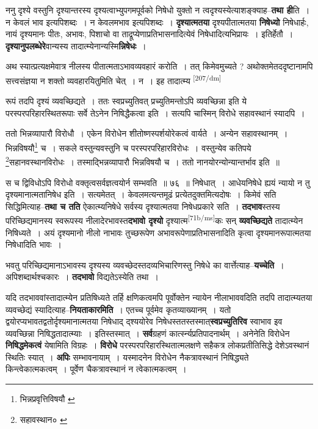 \documentclass[article,12pt,a4paper]{memoir}
\begin{document}
	  \pstart ननु दृश्ये वस्तुनि दृश्यान्तरस्य दृश्यत्वाभ्युपगमपूर्वको निषेधो युक्तो न त्वदृश्यस्येत्याशङ्क्याह--\textbf{तथा ही}ति । न केवलं भाव इत्यपिशब्दः । न केवलमभाव इत्यपिशब्दः । \textbf{दृश्यात्मतया} दृश्यपीतात्मतया \textbf{निषेध्यो} निषेधार्हः, नायं दृश्यमानः पीतः, अभावः, पिशाचो वा ताद्रूप्येणाप्रतिभासनादित्येवं निषेधादित्यभिप्रायः । इतिर्हेतौ । \textbf{दृश्यानुपलब्धेरे}वान्यस्य तादात्म्येनान्यस्मि\textbf{न्निषेधः} ।
	\pend
      

	  \pstart अथ स्यात्प्रत्यक्षमेवात्र नीलस्य पीतात्मताऽभावव्यवहारं करोति । तत् किमेवमुच्यते ? अथोक्तमेतददृष्टानामपि सत्त्वसंज्ञया न शक्तो व्यवहारयितुमिति चेत् । न । इह तादात्म्य \leavevmode\textsuperscript{\rmlatinfont\tiny [207/dm]} 
	  
	रूपं तदपि दृश्यं व्यवच्छिद्यते । ततः स्वप्रच्युतिवत् प्रच्युतिमन्तोऽपि व्यवच्छिन्ना इति ये परस्परपरिहारस्थितरूपाः सर्वे तेऽनेन निषिद्धैकत्वा इति । सत्यपि चास्मिन् विरोधे सहावस्थानं स्यादपि । 
	  
	ततो भिन्नव्यापारौ विरोधौ । एकेन विरोधेन शीतोष्णस्पर्शयोरेकत्वं वार्यते । अन्येन सहावस्थानम् । भिन्नविषयौ\footnote{भिन्नप्रवृत्तिविषयौ \cite{dp-msA} \cite{dp-edP} \cite{dp-edH} \cite{dp-edN}} च । सकले वस्तुन्यवस्तुनि च परस्परपरिहारविरोधः । वस्तुन्येव कतिपये \footnote{सहावस्थान० \cite{dp-msB} \cite{dp-msC}}सहानवस्थानविरोधः । तस्माद्भिन्नव्यापारौ भिन्नविषयौ च । ततो नानयोरन्योन्यान्तर्भाव इति ॥ 
	  
	स च द्विविधोऽपि विरोधो वक्तृत्वसर्वज्ञत्वयोर्न सम्भवति ॥ ७६ ॥ निषेधात् । आधेयनिषेधे ह्ययं न्यायो न तु दृश्यमानात्मतानिषेध इति । सत्यमेतत् । केवलमत्यन्तमूढं प्रत्येतदुक्तमित्यदोषः । किमेवं सति सिद्धिमित्याह--\textbf{तथा च तति} ऐकात्म्यनिषेधे सर्वस्य दृश्यात्मतया निषेधप्रकारे सति । \textbf{तदभाव}स्तस्य परिच्छिद्यमानस्य स्वरूपस्य नीलादेरभावस्त\textbf{दभावो दृश्यो} दृश्यात्म\leavevmode\textsuperscript{\rmlatinfont\tiny [71b/ms]}कः सन् \textbf{व्यवच्छिद्यते} तादात्म्येन निषिध्यते । अयं दृश्यमानो नीलो नाभावः तुच्छरूपेण अभावरूपेणाप्रतिभासनादिति कृत्वा दृश्यमानरूपात्मतया निषेधादिति भावः ।
	\pend
      

	  \pstart भवतु परिच्छिद्यमानाऽभावस्य दृश्यस्य व्यवच्छेदस्तदव्यभिचारिणस्तु निषेधे का वार्त्तेत्याह--\textbf{यच्चेति} । अपिशब्दार्थश्चकारः । \textbf{तदभावो} विद्यतेऽस्येति तथा ।
	\pend
      

	  \pstart यदि तदभाववांस्तादात्म्येन प्रतिषिध्यते तर्हि क्षणिकत्वमपि पूर्वोक्तेन न्यायेन नीलाभाववदिति तदपि तादात्म्यतया व्यवच्छेद्यं स्यादित्याह--\textbf{नियताकारमिति} । एतच्च पूर्वमेव कृतव्याख्यानम् । यतो द्वयोरप्यभावतद्वतोर्दृश्यमानात्मतया निषेधाद् द्श्ययोरेव निषेधस्ततस्तस्मात्\textbf{स्वप्रच्युतिरिव} स्वाभाव इव व्यवच्छिन्ना निषिद्धतादात्म्याः । इतिस्तस्मात् । \textbf{सर्व}ग्रहणं कार्त्स्न्यप्रतिपादनार्थम् । अनेनेति विरोधेन \textbf{निषिद्धमेकत्वं} येषामिति विग्रहः । \textbf{विरोधे} परस्परपरिहारस्थितात्मलक्षणे सहैकत्र लोकप्रतीतिसिद्धे देशेऽवस्थानं स्थितिः स्यात् । \textbf{अपिः} सम्भावनायाम् । यस्मादनेन विरोधेन नैकत्रावस्थानं निषिद्ध्यते किन्त्वेकात्मकत्वम् । पूर्वेण चैकत्रावस्थानं न त्वेकात्मकत्वम् ।
	\pend
      
\end{document}
